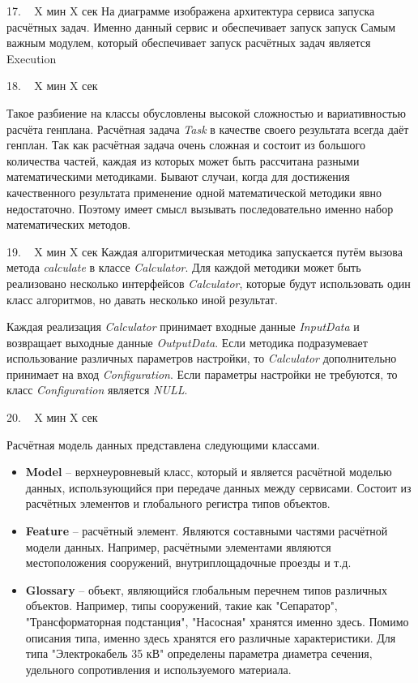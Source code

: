 \documentclass[11pt]{article}
\begin{document}
    17. ~ X мин X сек
    На диаграмме изображена архитектура сервиса запуска расчётных задач.
    Именно данный сервис и обеспечивает запуск запуск
    Самым важным модулем, который обеспечивает запуск расчётных задач является Execution

    18. ~ X мин X сек

    Такое разбиение на классы обусловлены высокой сложностью и вариативностью расчёта генплана.
    Расчётная задача \textit{Task} в качестве своего результата всегда даёт генплан.
    Так как расчётная задача очень сложная и состоит из большого количества частей,
    каждая из которых может быть рассчитана разными математическими методиками.
    Бывают случаи, когда для достижения качественного результата применение одной математической методики
    явно недостаточно. Поэтому имеет смысл вызывать последовательно именно набор математических методов.

    19. ~ X мин X сек
    Каждая алгоритмическая методика запускается путём вызова метода \textit{calculate}
    в классе \textit{Calculator}.
    Для каждой методики может быть реализовано несколько интерфейсов \textit{Calculator},
    которые будут использовать один класс алгоритмов, но давать несколько иной результат.

    Каждая реализация \textit{Calculator} принимает входные данные \textit{InputData}
    и возвращает выходные данные \textit{OutputData}.
    Если методика подразумевает использование различных параметров настройки, то \textit{Calculator} дополнительно
    принимает на вход \textit{Configuration}. Если параметры настройки не требуются, то класс \textit{Configuration}
    является \textit{NULL}.

    20. ~ X мин X сек

    Расчётная модель данных представлена следующими классами.
    \begin{itemize}
        \item \textbf{Model} -- верхнеуровневый класс, который и является расчётной моделью данных, использующийся
        при передаче данных между сервисами. Состоит из расчётных элементов и глобального регистра типов объектов.
        \item {
            \textbf{Feature} -- расчётный элемент. Являются составными частями расчётной модели данных. Например, расчётными
            элементами являются местоположения сооружений, внутриплощадочные проезды и т.д.
        }
        \item {
            \textbf{Glossary} -- объект, являющийся глобальным перечнем типов различных объектов.
            Например, типы сооружений, такие как "Сепаратор", "Трансформаторная подстанция", "Насосная" хранятся именно
            здесь. Помимо описания типа, именно здесь хранятся его различные характеристики. Для типа "Электрокабель 35 кВ"
            определены параметра диаметра сечения, удельного сопротивления и используемого материала.
        }
\end{itemize}
\end{document}
